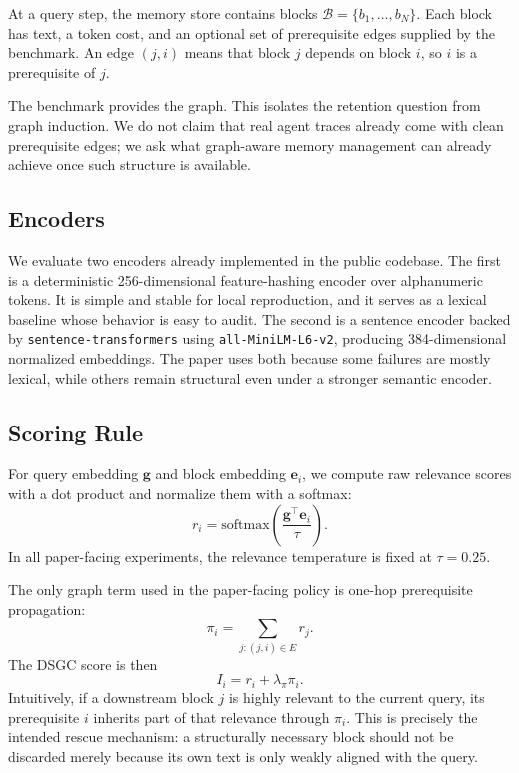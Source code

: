 \documentclass[10pt]{article}
\begin{document}
At a query step, the memory store contains blocks $\mathcal{B} = \{b_1,\dots,b_N\}$. Each block has text, a token cost, and an optional set of prerequisite edges supplied by the benchmark. An edge $(j,i)$ means that block $j$ depends on block $i$, so $i$ is a prerequisite of $j$.

The benchmark provides the graph. This isolates the retention question from graph induction. We do not claim that real agent traces already come with clean prerequisite edges; we ask what graph-aware memory management can already achieve once such structure is available.

\subsection{Encoders}

We evaluate two encoders already implemented in the public codebase. The first is a deterministic 256-dimensional feature-hashing encoder over alphanumeric tokens. It is simple and stable for local reproduction, and it serves as a lexical baseline whose behavior is easy to audit. The second is a sentence encoder backed by \texttt{sentence-transformers} using \texttt{all-MiniLM-L6-v2}, producing 384-dimensional normalized embeddings. The paper uses both because some failures are mostly lexical, while others remain structural even under a stronger semantic encoder.

\subsection{Scoring Rule}

For query embedding $\mathbf{g}$ and block embedding $\mathbf{e}_i$, we compute raw relevance scores with a dot product and normalize them with a softmax:
\[
r_i = \mathrm{softmax}\!\left(\frac{\mathbf{g}^\top \mathbf{e}_i}{\tau}\right).
\]
In all paper-facing experiments, the relevance temperature is fixed at $\tau=0.25$.

The only graph term used in the paper-facing policy is one-hop prerequisite propagation:
\[
\pi_i = \sum_{j : (j,i)\in E} r_j.
\]
The DSGC score is then
\[
I_i = r_i + \lambda_\pi \pi_i.
\]
Intuitively, if a downstream block $j$ is highly relevant to the current query, its prerequisite $i$ inherits part of that relevance through $\pi_i$. This is precisely the intended rescue mechanism: a structurally necessary block should not be discarded merely because its own text is only weakly aligned with the query.
\end{document}
